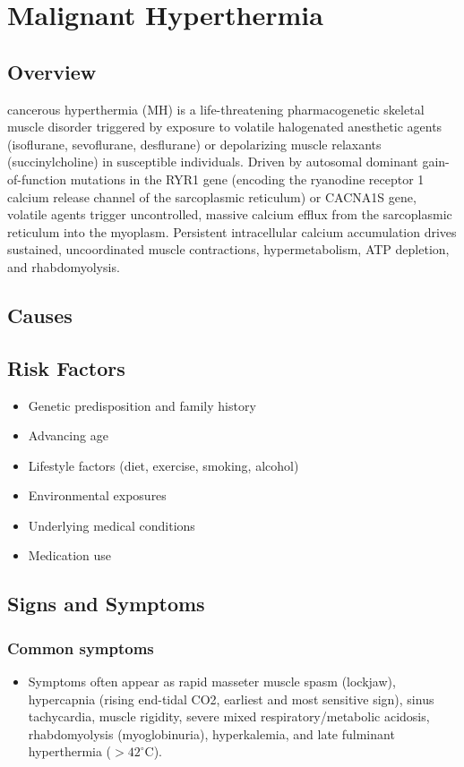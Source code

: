 \chapter{Malignant Hyperthermia}
\label{sec:Malignant Hyperthermia}

\section{Overview}
cancerous hyperthermia (MH) is a life-threatening pharmacogenetic skeletal muscle disorder triggered by exposure to volatile halogenated anesthetic agents (isoflurane, sevoflurane, desflurane) or depolarizing muscle relaxants (succinylcholine) in susceptible individuals. Driven by autosomal dominant gain-of-function mutations in the RYR1 gene (encoding the ryanodine receptor 1 calcium release channel of the sarcoplasmic reticulum) or CACNA1S gene, volatile agents trigger uncontrolled, massive calcium efflux from the sarcoplasmic reticulum into the myoplasm. Persistent intracellular calcium accumulation drives sustained, uncoordinated muscle contractions, hypermetabolism, ATP depletion, and rhabdomyolysis.
\section{Causes}
\section{Risk Factors}

\begin{itemize}[noitemsep]
  \item Genetic predisposition and family history
  \item Advancing age
  \item Lifestyle factors (diet, exercise, smoking, alcohol)
  \item Environmental exposures
  \item Underlying medical conditions
  \item Medication use
\end{itemize}
\section{Signs and Symptoms}

\subsection{Common symptoms}
\begin{itemize}[noitemsep]
  \item Symptoms often appear as rapid masseter muscle spasm (lockjaw), hypercapnia (rising end-tidal CO2, earliest and most sensitive sign), sinus tachycardia, muscle rigidity, severe mixed respiratory/metabolic acidosis, rhabdomyolysis (myoglobinuria), hyperkalemia, and late fulminant hyperthermia ($>42^\circ\mathrm{C}$). 
  \end{itemize}

